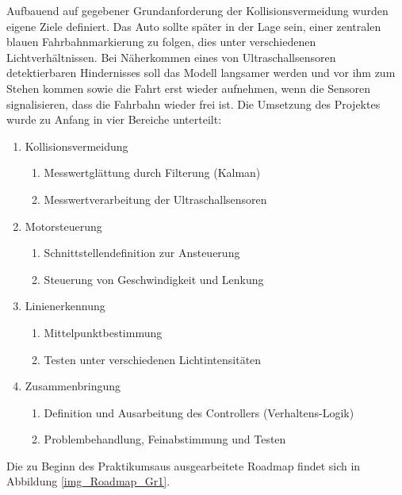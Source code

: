 \documentclass[12pt,a4paper]{report}
\begin{document}
Aufbauend auf gegebener Grundanforderung der Kollisionsvermeidung wurden eigene Ziele definiert. Das Auto sollte später in der Lage sein, einer zentralen blauen Fahrbahnmarkierung zu folgen, dies unter verschiedenen Lichtverhältnissen. Bei Näherkommen eines von Ultraschallsensoren detektierbaren Hindernisses soll das Modell langsamer werden und vor ihm zum Stehen kommen sowie die Fahrt erst wieder aufnehmen, wenn die Sensoren signalisieren, dass die Fahrbahn wieder frei ist.
\newpage
Die Umsetzung des Projektes wurde zu Anfang in vier Bereiche unterteilt:
\begin{enumerate}
	\item{Kollisionsvermeidung
	\begin{enumerate}
		\item Messwertglättung durch Filterung (Kalman)
		\item Messwertverarbeitung der Ultraschallsensoren
	\end{enumerate}}
	\item {Motorsteuerung
		\begin{enumerate}
		\item Schnittstellendefinition zur Ansteuerung
		\item Steuerung von Geschwindigkeit und Lenkung
		\end{enumerate}}
	\item{Linienerkennung
	\begin{enumerate}
		\item Mittelpunktbestimmung
		\item Testen unter verschiedenen Lichtintensitäten
		\end{enumerate}}
		\item{Zusammenbringung
		\begin{enumerate}
			\item Definition und Ausarbeitung des Controllers (Verhaltens-Logik)
			\item Problembehandlung, Feinabstimmung und Testen
		\end{enumerate}}
\end{enumerate}
Die zu Beginn des Praktikumsaus ausgearbeitete Roadmap findet sich in Abbildung \ref{img_Roadmap_Gr1}.
\end{document}
